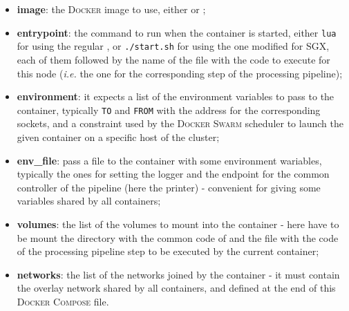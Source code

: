 \begin{itemize}
  \item \textbf{image}: the \textsc{Docker} image to use, either \dockerimagelua{} or \dockerimageluasgx{};
  \item \textbf{entrypoint}: the command to run when the container is started, either \texttt{lua} for using the regular \luavm{}, or \texttt{./start.sh} for using the one modified for SGX, each of them followed by the name of the file with the code to execute for this node (\textit{i.e.} the one for the corresponding step of the processing pipeline);
  \item \textbf{environment}: it expects a list of the environment variables to pass to the container, typically \texttt{TO} and \texttt{FROM} with the address for the corresponding sockets, and a constraint used by the \textsc{Docker Swarm} scheduler to launch the given container on a specific host of the cluster;
  \item \textbf{env\_file}: pass a file to the container with some environment wariables, typically the ones for setting the logger and the endpoint for the common controller of the pipeline (here the printer) - convenient for giving some variables shared by all containers;
  \item \textbf{volumes}: the list of the volumes to mount into the container - here have to be mount the directory with the common code of \SS{} and the file with the code of the processing pipeline step to be executed by the current container;
  \item \textbf{networks}: the list of the networks joined by the container - it must contain the overlay network shared by all containers, and defined at the end of this \textsc{Docker Compose} file.
\end{itemize}


